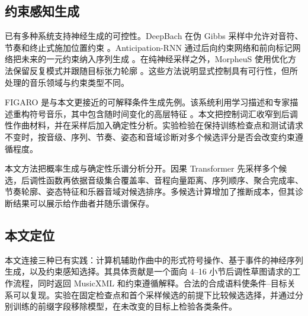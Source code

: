 \subsection{约束感知生成}

已有多种系统支持神经生成的可控性。DeepBach 在伪 Gibbs 采样中允许对音符、节奏和终止式施加位置约束 \citep{hadjeres2017deepbach}。Anticipation-RNN 通过后向约束网络和前向标记网络把未来的一元约束纳入序列生成 \citep{hadjeres2020anticipation}。在纯神经采样之外，MorpheuS 使用优化方法保留反复模式并跟随目标张力轮廓 \citep{herremans2019morpheus}。这些方法说明显式控制具有可行性，但所处理的音乐领域与约束类型不同。

FIGARO 是与本文更接近的可解释条件生成先例。该系统利用学习描述和专家描述重构符号音乐，其中包含随时间变化的高层特征 \citep{vonrutte2023figaro}。本文把控制词汇收窄到后调性作曲材料，并在采样后加入确定性分析。实验检验在保持训练检查点和测试请求不变时，按音级、序列、节奏、姿态和音域诊断对多个候选评分是否会改变约束遵循程度。

本文方法把概率生成与确定性乐谱分析分开。因果 Transformer 先采样多个候选，后调性函数再依据音级集合覆盖率、音程向量距离、序列顺序、聚合完成率、节奏轮廓、姿态特征和乐器音域对候选排序。多候选计算增加了推断成本，但其诊断结果可以展示给作曲者并随乐谱保存。

\subsection{本文定位}

本文连接三种已有实践：计算机辅助作曲中的形式符号操作、基于事件的神经序列生成，以及约束感知选择。其具体贡献是一个面向 4--16 小节后调性草图请求的工作流程，同时返回 MusicXML 和约束遵循解释。合法的合成语料使条件--目标关系可以复现。实验在固定检查点和首个采样候选的前提下比较候选选择，并通过分别训练的前缀字段移除模型，在未改变的目标上检验各类条件。
